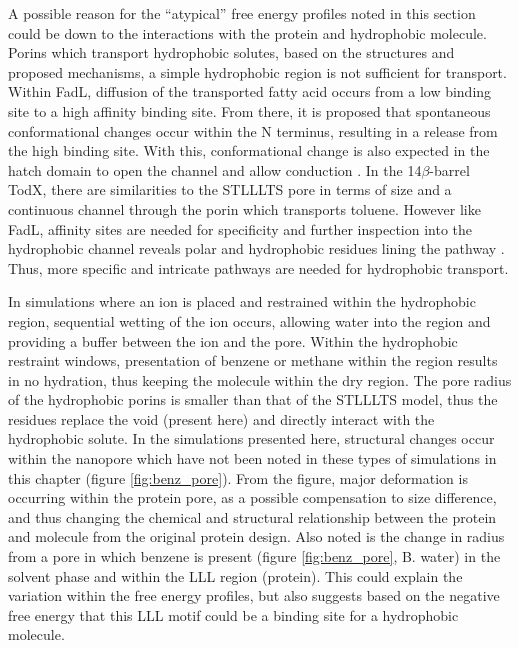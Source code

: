 A possible reason for the ``atypical'' free energy profiles noted in this section could be down to the interactions with the protein and hydrophobic molecule. Porins which transport hydrophobic solutes, based on the structures and proposed mechanisms, a simple hydrophobic region is not sufficient for transport. Within FadL, diffusion of the transported fatty acid occurs from a low binding site to a high affinity binding site. From there, it is proposed that spontaneous conformational changes occur within the N terminus, resulting in a release from the high binding site. With this, conformational change is also expected in the hatch domain to open the channel and allow conduction \cite{VanDenBerg2005,Zou2008}. In the 14$\beta$-barrel TodX, there are similarities to the STLLLTS pore in terms of size and a continuous channel through the porin which transports toluene. However like FadL, affinity sites are needed for specificity and further inspection into the hydrophobic channel reveals polar and hydrophobic residues lining the pathway \cite{Hearn2008}. Thus, more specific and intricate pathways are needed for hydrophobic transport. 

In simulations where an ion is placed and restrained within the hydrophobic region, sequential wetting of the ion occurs, allowing water into the region and providing a buffer between the ion and the pore. Within the hydrophobic restraint windows, presentation of benzene or methane within the region results in no hydration, thus keeping the molecule within the dry region. The pore radius of the hydrophobic porins is smaller than that of the STLLLTS model, thus the residues  replace the void (present here) and directly interact with the hydrophobic solute. In the simulations presented here, structural changes occur within the nanopore which have not been noted in these types of simulations in this chapter  (figure \ref{fig:benz_pore}). From the figure, major deformation is occurring within the protein pore, as a possible compensation to size difference, and thus changing the chemical and structural relationship between the protein and molecule from the original protein design. Also noted is the change in radius from a pore in which benzene is present (figure \ref{fig:benz_pore}, B. water) in the solvent phase and within the LLL region (protein). This could explain the variation within the free energy profiles, but also suggests based on the negative free energy that this LLL motif could be a binding site for a hydrophobic molecule. 

\hfill 

